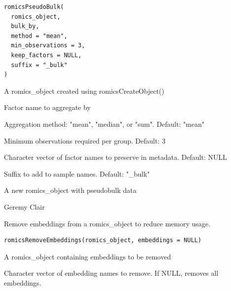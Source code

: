 \documentclass[a4paper]{book}
\begin{document}
%
\begin{Usage}
\begin{verbatim}
romicsPseudoBulk(
  romics_object,
  bulk_by,
  method = "mean",
  min_observations = 3,
  keep_factors = NULL,
  suffix = "_bulk"
)
\end{verbatim}
\end{Usage}
%
\begin{Arguments}
\begin{ldescription}
\item[\code{romics\_object}] A romics\_object created using romicsCreateObject()

\item[\code{bulk\_by}] Factor name to aggregate by

\item[\code{method}] Aggregation method: "mean", "median", or "sum". Default: "mean"

\item[\code{min\_observations}] Minimum observations required per group. Default: 3

\item[\code{keep\_factors}] Character vector of factor names to preserve in metadata. Default: NULL

\item[\code{suffix}] Suffix to add to sample names. Default: "\_bulk"
\end{ldescription}
\end{Arguments}
%
\begin{Value}
A new romics\_object with pseudobulk data
\end{Value}
%
\begin{Author}
Geremy Clair
\end{Author}
%
\begin{Description}
Remove embeddings from a romics\_object to reduce memory usage.
\end{Description}
%
\begin{Usage}
\begin{verbatim}
romicsRemoveEmbeddings(romics_object, embeddings = NULL)
\end{verbatim}
\end{Usage}
%
\begin{Arguments}
\begin{ldescription}
\item[\code{romics\_object}] A romics\_object containing embeddings to be removed

\item[\code{embeddings}] Character vector of embedding names to remove. If NULL, removes all embeddings.
\end{ldescription}
\end{Arguments}
\end{document}
